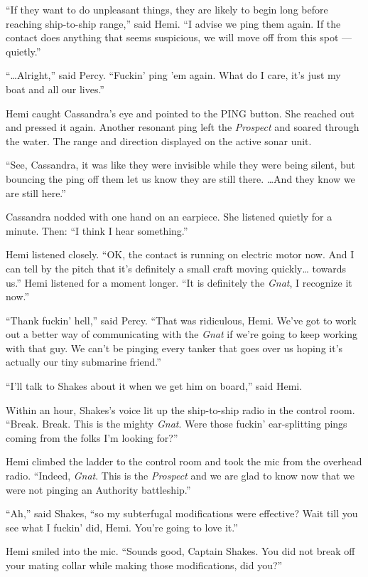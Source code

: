 \documentclass[
]{scrbook}
\begin{document}
``If they want to do unpleasant things, they are likely to begin long
before reaching ship-to-ship range,'' said Hemi. ``I advise we ping them
again. If the contact does anything that seems suspicious, we will move
off from this spot --- quietly.''

``\ldots Alright,'' said Percy. ``Fuckin' ping 'em again. What do I
care, it's just my boat and all our lives.''

Hemi caught Cassandra's eye and pointed to the PING button. She reached
out and pressed it again. Another resonant ping left the \emph{Prospect}
and soared through the water. The range and direction displayed on the
active sonar unit.

``See, Cassandra, it was like they were invisible while they were being
silent, but bouncing the ping off them let us know they are still there.
\ldots And they know we are still here.''

Cassandra nodded with one hand on an earpiece. She listened quietly for
a minute. Then: ``I think I hear something.''

Hemi listened closely. ``OK, the contact is running on electric motor
now. And I can tell by the pitch that it's definitely a small craft
moving quickly\ldots{} towards us.'' Hemi listened for a moment longer.
``It is definitely the \emph{Gnat}, I recognize it now.''

``Thank fuckin' hell,'' said Percy. ``That was ridiculous, Hemi. We've
got to work out a better way of communicating with the \emph{Gnat} if
we're going to keep working with that guy. We can't be pinging every
tanker that goes over us hoping it's actually our tiny submarine
friend.''

``I'll talk to Shakes about it when we get him on board,'' said Hemi.

\bigskip

Within an hour, Shakes's voice lit up the ship-to-ship radio in the
control room. ``Break. Break. This is the mighty \emph{Gnat}. Were those
fuckin' ear-splitting pings coming from the folks I'm looking for?''

Hemi climbed the ladder to the control room and took the mic from the
overhead radio. ``Indeed, \emph{Gnat}. This is the \emph{Prospect} and
we are glad to know now that we were not pinging an Authority
battleship.''

``Ah,'' said Shakes, ``so my subterfugal modifications were effective?
Wait till you see what I fuckin' did, Hemi. You're going to love it.''

Hemi smiled into the mic. ``Sounds good, Captain Shakes. You did not
break off your mating collar while making those modifications, did
you?''
\end{document}
